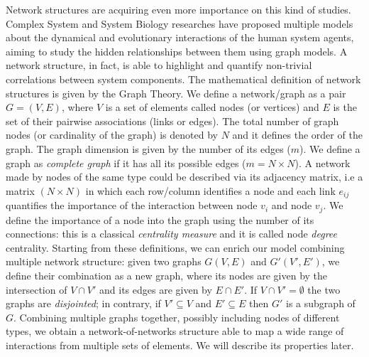 \documentclass{standalone}
\begin{document}
Network structures are acquiring even more importance on this kind of studies.
Complex System and System Biology researches have proposed multiple models about the dynamical and evolutionary interactions of the human system agents, aiming to study the hidden relationships between them using graph models.
A network structure, in fact, is able to highlight and quantify non-trivial correlations between system components.
The mathematical definition of network structures is given by the Graph Theory.
We define a network/graph as a pair $G = (V, E)$, where $V$ is a set of elements called nodes (or vertices) and $E$ is the set of their pairwise associations (links or edges).
The total number of graph nodes (or cardinality of the graph) is denoted by $N$ and it defines the order of the graph.
The graph dimension is given by the number of its edges ($m$).
We define a graph as \emph{complete graph} if it has all its possible edges ($m = N \times N$).
A network made by nodes of the same type could be described via its adjacency matrix, i.e a matrix $(N\times N)$ in which each row/column identifies a node and each link $e_{ij}$ quantifies the importance of the interaction between node $v_i$ and node $v_j$.
We define the importance of a node into the graph using the number of its connections: this is a classical \emph{centrality measure} and it is called node \emph{degree} centrality.
Starting from these definitions, we can enrich our model combining multiple network structure: given two graphs $G(V, E)$ and $G'(V', E')$, we define their combination as a new graph, where its nodes are given by the intersection of $V\cap V'$ and its edges are given by $E\cap E'$.
If $V\cap V'=\emptyset$ the two graphs are \emph{disjointed}; in contrary, if $V'\subseteq V$ and $E'\subseteq E$ then $G'$ is a subgraph of $G$.
Combining multiple graphs together, possibly including nodes of different types, we obtain a network-of-networks structure able to map a wide range of interactions from multiple sets of elements.
We will describe its properties later.
\end{document}
